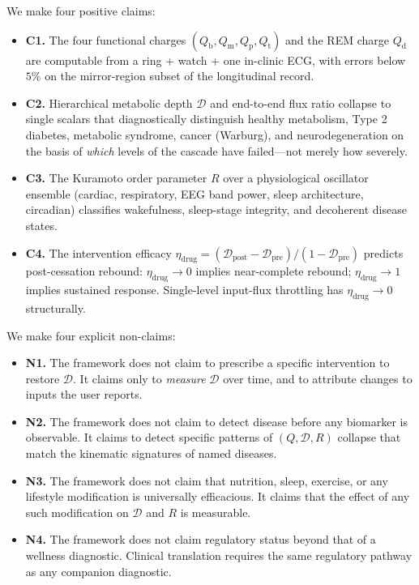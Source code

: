 \documentclass[11pt,twocolumn,a4paper]{article}
\theoremstyle{definition}
\theoremstyle{remark}
\newcommand{\Qb}{Q_{\mathrm{b}}}
\newcommand{\Qm}{Q_{\mathrm{m}}}
\newcommand{\Qp}{Q_{\mathrm{p}}}
\newcommand{\Qt}{Q_{\mathrm{t}}}
\newcommand{\Qd}{Q_{\mathrm{d}}}
\newcommand{\Dhier}{\mathcal{D}}
\newcommand{\etadrug}{\eta_{\mathrm{drug}}}
\newcommand{\Rcoh}{R}
\begin{document}
We make four positive claims:
\begin{itemize}[leftmargin=*]
\item \textbf{C1.} The four functional charges
$(\Qb, \Qm, \Qp, \Qt)$ and the REM charge $\Qd$ are computable from a
ring + watch + one in-clinic ECG, with errors below $5\%$ on the
mirror-region subset of the longitudinal record.

\item \textbf{C2.} Hierarchical metabolic depth $\Dhier$ and
end-to-end flux ratio collapse to single scalars that diagnostically
distinguish healthy metabolism, Type 2 diabetes, metabolic syndrome,
cancer (Warburg), and neurodegeneration on the basis of
\emph{which} levels of the cascade have failed---not merely how
severely.

\item \textbf{C3.} The Kuramoto order parameter $\Rcoh$ over a
physiological oscillator ensemble (cardiac, respiratory, EEG band
power, sleep architecture, circadian) classifies wakefulness,
sleep-stage integrity, and decoherent disease states.

\item \textbf{C4.} The intervention efficacy
$\etadrug = (\Dhier_{\mathrm{post}} - \Dhier_{\mathrm{pre}}) / (1 -
\Dhier_{\mathrm{pre}})$ predicts post-cessation rebound: $\etadrug
\to 0$ implies near-complete rebound; $\etadrug \to 1$ implies
sustained response. Single-level input-flux throttling has $\etadrug
\to 0$ structurally.
\end{itemize}

We make four explicit non-claims:

\begin{itemize}[leftmargin=*]
\item \textbf{N1.} The framework does not claim to prescribe a
specific intervention to restore $\Dhier$. It claims only to
\emph{measure} $\Dhier$ over time, and to attribute changes to
inputs the user reports.

\item \textbf{N2.} The framework does not claim to detect disease
before any biomarker is observable. It claims to detect specific
patterns of $(Q, \Dhier, \Rcoh)$ collapse that match the kinematic
signatures of named diseases.

\item \textbf{N3.} The framework does not claim that nutrition,
sleep, exercise, or any lifestyle modification is universally
efficacious. It claims that the effect of any such modification on
$\Dhier$ and $\Rcoh$ is measurable.

\item \textbf{N4.} The framework does not claim regulatory status
beyond that of a wellness diagnostic. Clinical translation requires
the same regulatory pathway as any companion diagnostic.
\end{itemize}
\end{document}
